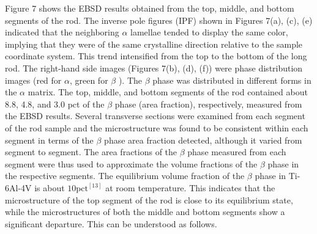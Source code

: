 \documentclass[10pt]{article}
\begin{document}
Figure 7 shows the EBSD results obtained from the top, middle, and bottom segments of the rod. The inverse pole figures (IPF) shown in Figures 7(a), (c), (e) indicated that the neighboring $\alpha$ lamellae tended to display the same color, implying that they were of the same crystalline direction relative to the sample coordinate system. This trend intensified from the top to the bottom of the long rod. The right-hand side images (Figures 7(b), (d), (f)) were phase distribution images (red for $\alpha$, green for $\beta$ ). The $\beta$ phase was distributed in different forms in the $\alpha$ matrix. The top, middle, and bottom segments of the rod contained about 8.8, 4.8, and 3.0 pct of the $\beta$ phase (area fraction), respectively, measured from the EBSD results. Several transverse sections were examined from each segment of the rod sample and the microstructure was found to be consistent within each segment in terms of the $\beta$ phase area fraction detected, although it varied from segment to segment. The area fractions of the $\beta$ phase measured from each segment were thus used to approximate the volume fractions of the $\beta$ phase in the respective segments. The equilibrium volume fraction of the $\beta$ phase in Ti-6Al-4V is about $10 \mathrm{pct}^{[13]}$ at room temperature. This indicates that the microstructure of the top segment of the rod is close to its equilibrium state, while the microstructures of both the middle and bottom segments show a significant departure. This can be understood as follows.
\end{document}
